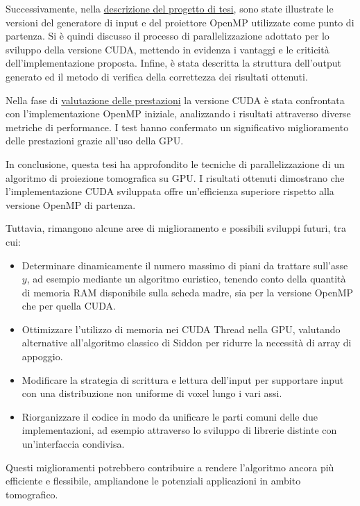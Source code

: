 \documentclass[12pt,a4paper]{report}
\begin{document}
Successivamente, nella \hyperref[chap:proj]{descrizione del progetto di tesi}, sono state illustrate le versioni del generatore di
input e del proiettore OpenMP utilizzate come punto di partenza.
Si è quindi discusso il processo di parallelizzazione adottato per lo sviluppo della versione CUDA, mettendo in evidenza i
vantaggi e le criticità dell'implementazione proposta.
Infine, è stata descritta la struttura dell'output generato ed il metodo di verifica della correttezza dei risultati ottenuti.

Nella fase di \hyperref[chap:perf]{valutazione delle prestazioni} la versione CUDA è stata confrontata con l'implementazione
OpenMP iniziale, analizzando i risultati attraverso diverse metriche di performance.
I test hanno confermato un significativo miglioramento delle prestazioni grazie all'uso della GPU.

In conclusione, questa tesi ha approfondito le tecniche di parallelizzazione di un algoritmo di proiezione tomografica su GPU.
I risultati ottenuti dimostrano che l'implementazione CUDA sviluppata offre un'efficienza superiore rispetto alla versione OpenMP
di partenza.

Tuttavia, rimangono alcune aree di miglioramento e possibili sviluppi futuri, tra cui:
\begin{itemize}
  \item Determinare dinamicamente il numero massimo di piani da trattare sull'asse \(y\), ad esempio mediante un algoritmo
        euristico, tenendo conto della quantità di memoria RAM disponibile sulla scheda madre, sia per la versione OpenMP che per
        quella CUDA.
  \item Ottimizzare l'utilizzo di memoria nei CUDA Thread nella GPU, valutando alternative all'algoritmo classico di Siddon per
        ridurre la necessità di array di appoggio.
  \item Modificare la strategia di scrittura e lettura dell'input per supportare input con una distribuzione non uniforme di voxel
        lungo i vari assi.
  \item Riorganizzare il codice in modo da unificare le parti comuni delle due implementazioni, ad esempio attraverso lo sviluppo
        di librerie distinte con un'interfaccia condivisa.
\end{itemize}

Questi miglioramenti potrebbero contribuire a rendere l'algoritmo ancora più efficiente e flessibile, ampliandone le potenziali
applicazioni in ambito tomografico.

\label{mylastpage}
\printbibliography %
\thispagestyle{empty} %
\pagestyle{empty} %
\end{document}
